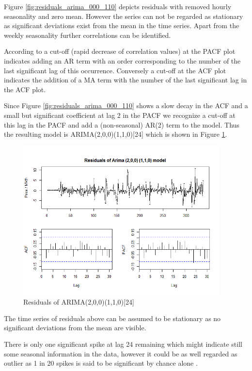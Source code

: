 Figure \ref{fig:residuals_arima_000_110} depicts residuals with removed hourly seasonality and zero mean. However the series can not be regarded as stationary as significant deviations exist from the mean in the time series. Apart from the weekly seasonality further correlations can be identified. 

According to \cite{nau2016statistical} a cut-off (rapid decrease of correlation values) at the PACF plot indicates adding an AR term with an order corresponding to the number of the last significant lag of this occurrence. Conversely a cut-off at the ACF plot indicates the addition of a MA term with the number of the last significant lag in the ACF plot. 

Since Figure \ref{fig:residuals_arima_000_110} shows a slow decay in the ACF and a small but significant coefficient at lag 2 in the PACF we recognize a cut-off at this lag in the PACF and add a (non-seasonal) AR(2) term to the model. 
Thus the resulting model is ARIMA(2,0,0)(1,1,0)[24] which is shown in Figure \ref{fig:residuals_arima_200_110}. 

\begin{figure}[htbp]
	\centering
		\includegraphics[width=0.95\textwidth]{figures/forecasting/residuals_arima_200_110.png}
	\caption{Residuals of ARIMA(2,0,0)(1,1,0)[24]}
	\label{fig:residuals_arima_200_110}
\end{figure}

The time series of residuals above can be assumed to be stationary as no significant deviations from the mean are visible. 

There is only one significant spike at lag 24 remaining which might indicate still some seasonal information in the data, however it could be as well regarded as outlier as 1 in 20 spikes is said to be significant by chance alone \cite{hyndman2012forecasting}. 


